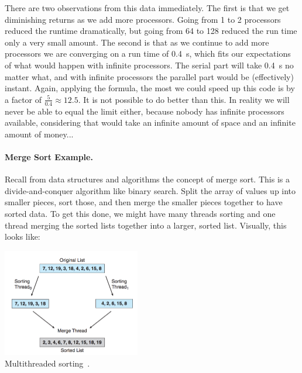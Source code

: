 There are two observations from this data immediately. The first is that we get diminishing returns as we add more processors. Going from 1 to 2 processors reduced the runtime dramatically, but going from 64 to 128 reduced the run time only a very small amount. The second is that as we continue to add more processors we are converging on a run time of 0.4~s, which fits our expectations of what would happen with infinite processors. The serial part will take 0.4~s no matter what, and with infinite processors the parallel part would be (effectively) instant. Again, applying the formula, the most we could speed up this code is by a factor of $\frac{5}{0.4}\approx 12.5$. It is not possible to do better than this. In reality we will never be able to equal the limit either, because nobody has infinite processors available, considering that would take an infinite amount of space and an infinite amount of money...

\paragraph{Merge Sort Example.}
Recall from data structures and algorithms the concept of merge sort. This is a divide-and-conquer algorithm like binary search. Split the array of values up into smaller pieces, sort those, and then merge the smaller pieces together to have sorted data. To get this done, we might have many threads sorting and one thread merging the sorted lists together into a larger, sorted list. Visually, this looks like:

\begin{center}
	\includegraphics[width=0.45\textwidth]{images/multithread-sort.png}\\
	Multithreaded sorting~\cite{osc}.
\end{center}





